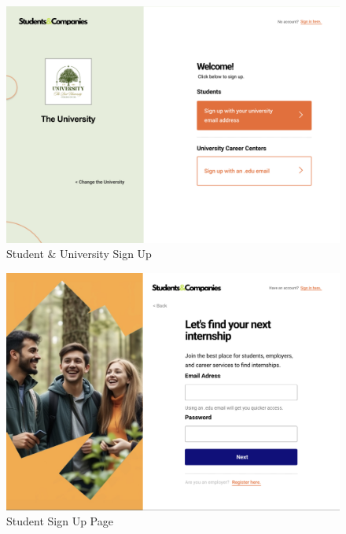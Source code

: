\documentclass[a4paper,12pt]{article}
\begin{document}
\begin{figure}[H]
    \centering
    \includegraphics[scale = 0.40]{figures/UserInterfaces/General/SUSignUp.png}
    \caption{Student \& University Sign Up}
    \centering
\end{figure}
\begin{figure}[H]
    \centering
    \includegraphics[scale = 0.45]{figures/UserInterfaces/General/StudentSignUp.png}
    \caption{Student Sign Up Page}
    \centering
\end{figure}
\end{document}
